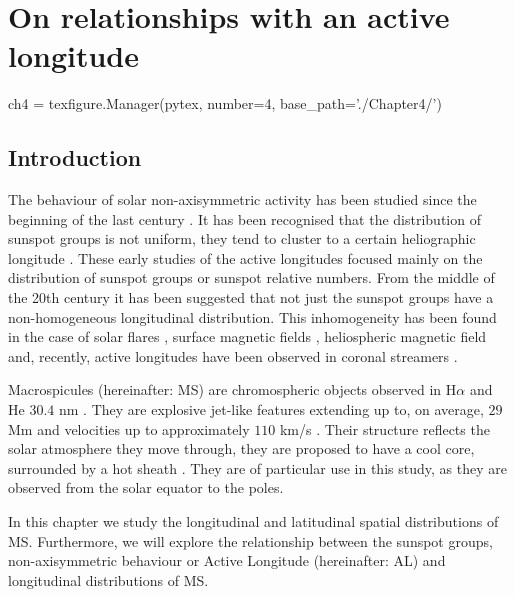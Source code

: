 \chapter{On relationships with an active longitude}\label{ch:4}  %

\begin{pycode}[chapter4]

ch4 = texfigure.Manager(pytex, number=4, base_path='./Chapter4/')
\end{pycode}

\section{Introduction}
The behaviour of solar non-axisymmetric activity has been studied since the beginning of the last century \cite{Chidambara1932}. It has been recognised that the distribution of sunspot groups is not uniform, they tend to cluster to a certain heliographic longitude \cite{Bumba1965,Balthasar1984,Wilkinson1991}. These early studies of the active longitudes focused mainly on the distribution of sunspot groups or sunspot relative numbers. From the middle of the 20th century it has been suggested that not just the sunspot groups have a non-homogeneous longitudinal distribution. This inhomogeneity has been found in the case of solar flares \cite{Zhang2007}, surface magnetic fields \cite{Benevolenskaya1999}, heliospheric magnetic field \cite{Mursula2004} and, recently, active longitudes have been observed in coronal streamers \cite{Jing2011}.

\newpage
Macrospicules (hereinafter: MS) are chromospheric objects observed in H$\alpha$ and He $30.4$ nm \cite{Bohlin1975,Wang1998,Murawski2011,Scullion2010}. They are explosive jet-like features extending up to, on average, $29$ Mm and velocities up to approximately $110$ km/s \cite{Zaqara_Erdelyi2009}. Their structure reflects the solar atmosphere they move through, they are proposed to have a cool core, surrounded by a hot sheath \cite{Parenti2002}. They are of particular use in this study, as they are observed from the solar equator to the poles. 

In this chapter we study the longitudinal and latitudinal spatial distributions of MS. Furthermore, we will explore the relationship between the sunspot groups, non-axisymmetric behaviour or Active Longitude (hereinafter: AL) and longitudinal distributions of MS.

